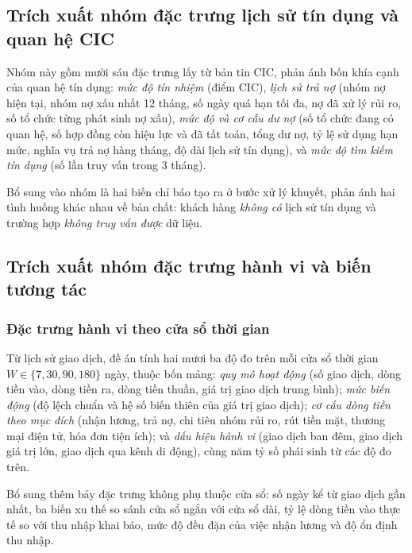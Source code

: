\subsection{Trích xuất nhóm đặc trưng lịch sử tín dụng và quan hệ CIC}
\label{subsec:dac-trung-cic}

Nhóm này gồm mười sáu đặc trưng lấy từ bản tin CIC, phản ánh bốn khía cạnh của
quan hệ tín dụng: \textit{mức độ tín nhiệm} (điểm CIC), \textit{lịch sử trả nợ}
(nhóm nợ hiện tại, nhóm nợ xấu nhất 12 tháng, số ngày quá hạn tối đa, nợ đã xử lý
rủi ro, số tổ chức từng phát sinh nợ xấu), \textit{mức độ và cơ cấu dư nợ} (số tổ
chức đang có quan hệ, số hợp đồng còn hiệu lực và đã tất toán, tổng dư nợ, tỷ lệ
sử dụng hạn mức, nghĩa vụ trả nợ hàng tháng, độ dài lịch sử tín dụng), và
\textit{mức độ tìm kiếm tín dụng} (số lần truy vấn trong 3 tháng).

Bổ sung vào nhóm là hai biến chỉ báo tạo ra ở bước xử lý khuyết, phản ánh hai
tình huống khác nhau về bản chất: khách hàng \textit{không có} lịch sử tín dụng
và trường hợp \textit{không truy vấn được} dữ liệu.

\subsection{Trích xuất nhóm đặc trưng hành vi và biến tương tác}
\label{subsec:dac-trung-hanh-vi}

\subsubsection{Đặc trưng hành vi theo cửa sổ thời gian}

Từ lịch sử giao dịch, đề án tính hai mươi ba độ đo trên mỗi cửa sổ thời gian
$W \in \{7, 30, 90, 180\}$ ngày, thuộc bốn mảng: \textit{quy mô hoạt động} (số
giao dịch, dòng tiền vào, dòng tiền ra, dòng tiền thuần, giá trị giao dịch trung
bình); \textit{mức biến động} (độ lệch chuẩn và hệ số biến thiên của giá trị giao
dịch); \textit{cơ cấu dòng tiền theo mục đích} (nhận lương, trả nợ, chi tiêu nhóm
rủi ro, rút tiền mặt, thương mại điện tử, hóa đơn tiện ích); và \textit{dấu hiệu
hành vi} (giao dịch ban đêm, giao dịch giá trị lớn, giao dịch qua kênh di động),
cùng năm tỷ số phái sinh từ các độ đo trên.

Bổ sung thêm bảy đặc trưng không phụ thuộc cửa sổ: số ngày kể từ giao dịch gần
nhất, ba biến xu thế so sánh cửa sổ ngắn với cửa sổ dài, tỷ lệ dòng tiền vào thực
tế so với thu nhập khai báo, mức độ đều đặn của việc nhận lương và độ ổn định thu
nhập.

